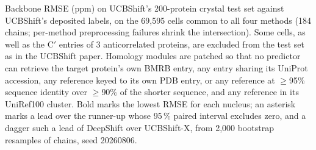 Backbone RMSE (ppm) on UCBShift's 200-protein crystal test set against UCBShift's deposited labels, on the 69,595 cells common to all four methods (184 chains; per-method preprocessing failures shrink the intersection). Some cells, as well as the C$'$ entries of 3 anticorrelated proteins, are excluded from the test set as in the UCBShift paper\cite{UCBShift}. Homology modules are patched so that no predictor can retrieve the target protein's own BMRB entry, any entry sharing its UniProt accession, any reference keyed to its own PDB entry, or any reference at $\geq$95\% sequence identity over $\geq$90\% of the shorter sequence, and any reference in its UniRef100 cluster. Bold marks the lowest RMSE for each nucleus; an asterisk marks a lead over the runner-up whose 95\,\% paired interval excludes zero, and a dagger such a lead of DeepShift over UCBShift-X, from 2,000 bootstrap resamples of chains, seed 20260806.

